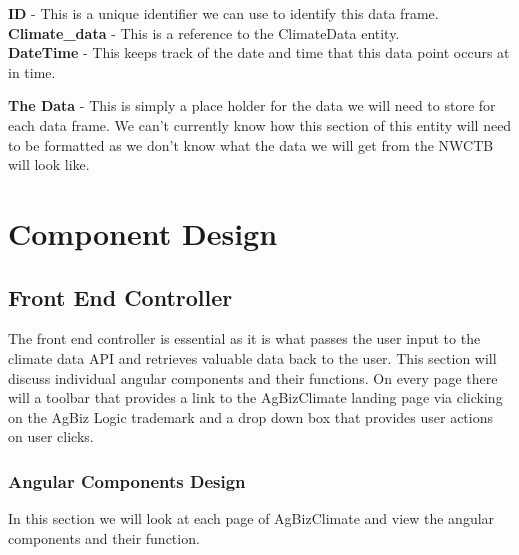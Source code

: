\documentclass[onecolumn, draftclsnofoot,10pt, compsoc]{article}
\begin{document}
					\textbf{ID} - This is a unique identifier we can use to identify this data frame.\\

					\textbf{Climate\_data} - This is a reference to the ClimateData entity.\\

					\textbf{DateTime} - This keeps track of the date and time that this data point occurs at in time.

					\textbf{The Data} - This is simply a place holder for the data we will need to store for each data frame. We can't currently know how this section of this entity will need to be formatted as we don't know what the data we will get from the NWCTB will look like.\\





\section{Component Design}

	\subsection{Front End Controller}
		The front end controller is essential as it is what passes the user input to the climate data API and retrieves valuable data back to the user. This section will discuss individual angular components and their functions. On every page there will a toolbar that provides a link to the AgBizClimate landing page via clicking on the AgBiz Logic trademark and a drop down box that provides user actions on user clicks.
		\subsubsection{Angular Components Design}
		In this section we will look at each page of AgBizClimate and view the angular components and their function.
\end{document}
